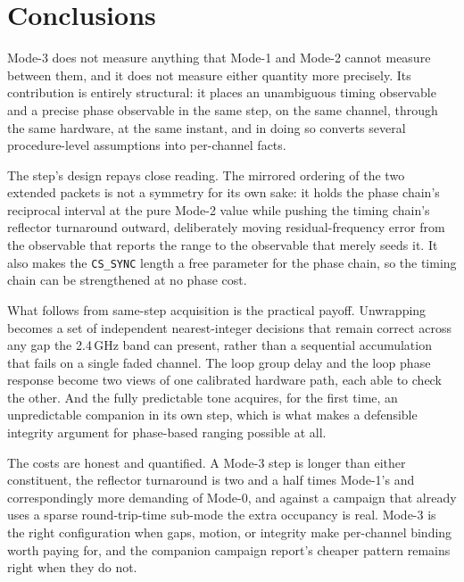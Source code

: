 \documentclass[11pt,a4paper]{article}
\newcommand{\code}[1]{\texttt{\small #1}}
\begin{document}
\section{Conclusions}

Mode-3 does not measure anything that Mode-1 and Mode-2 cannot measure between them, and it does not
measure either quantity more precisely. Its contribution is entirely structural: it places an
unambiguous timing observable and a precise phase observable in the same step, on the same channel,
through the same hardware, at the same instant, and in doing so converts several procedure-level
assumptions into per-channel facts.

The step's design repays close reading. The mirrored ordering of the two extended packets is not a
symmetry for its own sake: it holds the phase chain's reciprocal interval at the pure Mode-2 value
while pushing the timing chain's reflector turnaround outward, deliberately moving residual-frequency
error from the observable that reports the range to the observable that merely seeds it. It also
makes the \code{CS\_SYNC} length a free parameter for the phase chain, so the timing chain can be
strengthened at no phase cost.

What follows from same-step acquisition is the practical payoff. Unwrapping becomes a set of
independent nearest-integer decisions that remain correct across any gap the 2.4\,GHz band can
present, rather than a sequential accumulation that fails on a single faded channel. The loop group
delay and the loop phase response become two views of one calibrated hardware path, each able to
check the other. And the fully predictable tone acquires, for the first time, an unpredictable
companion in its own step, which is what makes a defensible integrity argument for phase-based
ranging possible at all.

The costs are honest and quantified. A Mode-3 step is longer than either constituent, the reflector
turnaround is two and a half times Mode-1's and correspondingly more demanding of Mode-0, and against
a campaign that already uses a sparse round-trip-time sub-mode the extra occupancy is real. Mode-3 is
the right configuration when gaps, motion, or integrity make per-channel binding worth paying for,
and the companion campaign report's cheaper pattern remains right when they do not.

\appendix
\end{document}
